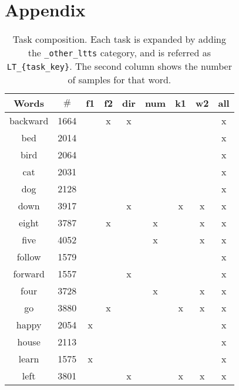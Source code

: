 \section{Appendix}
\label{sec:appendix}


\begin{table}[h!]
    \centering
    \caption{Task composition.
    Each task is expanded by adding the
    \texttt{\_other\_ltts}
    category,
    and is referred as
    \texttt{LT\_\{task\_key\}}.
    The second column shows the number of samples for that word.
    }
    \label{tab:task_word_composition}
    \begin{tabular}{|c|c|ccccccc|}
        \hline
        Words & $\#$          &f1 &f2 &dir&num&k1 &w2 &all \\
        \hline
        backward & 1664       &   & x & x &   &   &   & x  \\
        bed & 2014            &   &   &   &   &   &   & x  \\
        bird & 2064           &   &   &   &   &   &   & x  \\
        cat & 2031            &   &   &   &   &   &   & x  \\
        \hline
        dog & 2128            &   &   &   &   &   &   & x  \\
        down & 3917           &   &   & x &   & x & x & x  \\
        eight & 3787          &   & x &   & x &   & x & x  \\
        five & 4052           &   &   &   & x &   & x & x  \\
        \hline
        follow & 1579         &   &   &   &   &   &   & x  \\
        forward & 1557        &   &   & x &   &   &   & x  \\
        four & 3728           &   &   &   & x &   & x & x  \\
        go & 3880             &   & x &   &   & x & x & x  \\
        \hline
        happy & 2054          & x &   &   &   &   &   & x  \\
        house & 2113          &   &   &   &   &   &   & x  \\
        learn & 1575          & x &   &   &   &   &   & x  \\
        left & 3801           &   &   & x &   & x & x & x  \\

\end{tabular}
\end{table}
